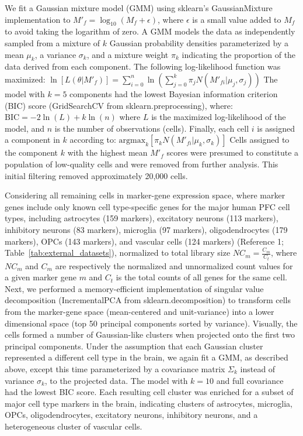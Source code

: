 \documentclass[12pt]{article}
\begin{document}
We fit a Gaussian mixture model (GMM) using sklearn's GaussianMixture implementation to $M'_f = \log_{10}(M_f + \epsilon)$, where $\epsilon$ is a small value added to $M_f$ to avoid taking the logarithm of zero. A GMM models the data as independently sampled from a mixture of $k$ Gaussian probability densities parameterized by a mean $\mu_k$, a variance $\sigma_k$, and a mixture weight $\pi_k$ indicating the proportion of the data derived from each component. The following log-likelihood function was maximized:
$ \ln[L(\theta|M'_f)] = \sum_{i=0}^{n} \ln \left( \sum_{j=0}^{k} \pi_j N(M'_{fi}|\mu_j, \sigma_j) \right) $
The model with $k = 5$ components had the lowest Bayesian information criterion (BIC) score (GridSearchCV from sklearn.preprocessing), where:
$ \text{BIC} = -2 \ln(L) + k \ln(n) $
where $L$ is the maximized log-likelihood of the model, and $n$ is the number of observations (cells). Finally, each cell $i$ is assigned a component in $k$ according to:
$ \text{argmax}_k \left[ \pi_k N(M'_{fi}|\mu_k, \sigma_k) \right] $
Cells assigned to the component $k$ with the highest mean $M'_f$ scores were presumed to constitute a population of low-quality cells and were removed from further analysis. This initial filtering removed approximately 20,000 cells.

Considering all remaining cells in marker-gene expression space, where marker genes include only known cell type-specific genes for the major human PFC cell types, including astrocytes (159 markers), excitatory neurons (113 markers), inhibitory neurons (83 markers), microglia (97 markers), oligodendrocytes (179 markers), OPCs (143 markers), and vascular cells (124 markers) (Reference 1; Table~\ref{tab:external_datasets}), normalized to total library size $NC_m = \frac{C_m}{C_t}$, where $NC_m$ and $C_m$ are respectively the normalized and unnormalized count values for a given marker gene $m$ and $C_t$ is the total counts of all genes for the same cell. Next, we performed a memory-efficient implementation of singular value decomposition (IncrementalPCA from sklearn.decomposition) to transform cells from the marker-gene space (mean-centered and unit-variance) into a lower dimensional space (top 50 principal components sorted by variance). Visually, the cells formed a number of Gaussian-like clusters when projected onto the first two principal components. Under the assumption that each Gaussian cluster represented a different cell type in the brain, we again fit a GMM, as described above, except this time parameterized by a covariance matrix $\Sigma_k$ instead of variance $\sigma_k$, to the projected data. The model with $k = 10$ and full covariance had the lowest BIC score. Each resulting cell cluster was enriched for a subset of major cell type markers in the brain, indicating clusters of astrocytes, microglia, OPCs, oligodendrocytes, excitatory neurons, inhibitory neurons, and a heterogeneous cluster of vascular cells.
\end{document}
